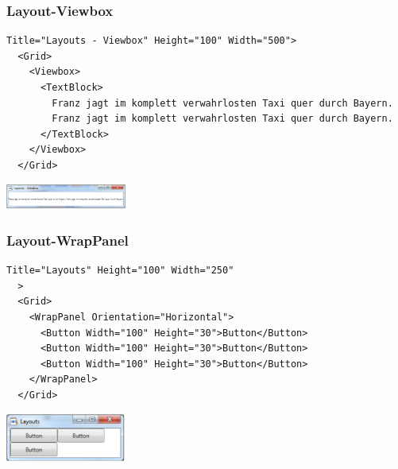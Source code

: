 \subsubsection{Layout-Viewbox}
\begin{minipage}{14cm}
\begin{lstlisting}[style=CSharp]
  Title="Layouts - Viewbox" Height="100" Width="500">
  <Grid>
    <Viewbox>
      <TextBlock>
        Franz jagt im komplett verwahrlosten Taxi quer durch Bayern.
        Franz jagt im komplett verwahrlosten Taxi quer durch Bayern.
      </TextBlock>
    </Viewbox>
  </Grid>
\end{lstlisting}
\end{minipage}
\begin{minipage}{4cm}
  \includegraphics[width=4cm]{images/XAML/Viewbox}
\end{minipage}

\subsubsection{Layout-WrapPanel}
\begin{minipage}{14cm}
\begin{lstlisting}[style=CSharp]
  Title="Layouts" Height="100" Width="250"
  >
  <Grid>
    <WrapPanel Orientation="Horizontal">
      <Button Width="100" Height="30">Button</Button>
      <Button Width="100" Height="30">Button</Button>
      <Button Width="100" Height="30">Button</Button>
    </WrapPanel>
  </Grid>
\end{lstlisting}
\end{minipage}
\begin{minipage}{4cm}
  \includegraphics[width=4cm]{images/XAML/WrapPanel}
\end{minipage}

